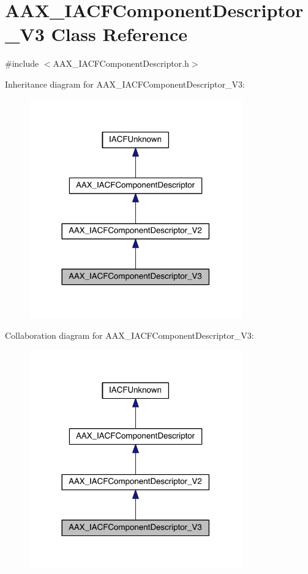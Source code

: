 \hypertarget{a00052}{}\section{A\+A\+X\+\_\+\+I\+A\+C\+F\+Component\+Descriptor\+\_\+\+V3 Class Reference}
\label{a00052}


{\ttfamily \#include $<$A\+A\+X\+\_\+\+I\+A\+C\+F\+Component\+Descriptor.\+h$>$}



Inheritance diagram for A\+A\+X\+\_\+\+I\+A\+C\+F\+Component\+Descriptor\+\_\+\+V3\+:
\nopagebreak
\begin{figure}[H]
\begin{center}
\leavevmode
\includegraphics[width=260pt]{a00499}
\end{center}
\end{figure}


Collaboration diagram for A\+A\+X\+\_\+\+I\+A\+C\+F\+Component\+Descriptor\+\_\+\+V3\+:
\nopagebreak
\begin{figure}[H]
\begin{center}
\leavevmode
\includegraphics[width=260pt]{a00500}
\end{center}
\end{figure}


